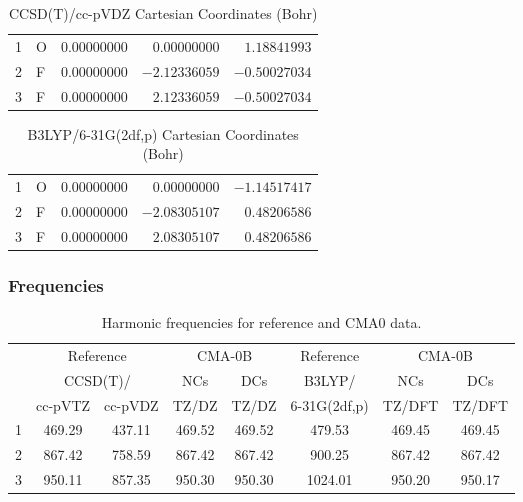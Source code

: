 \documentclass[10pt,oneside]{article}
\begin{document}
\begin{table}[h!]
\centering
\caption{CCSD(T)/cc-pVDZ Cartesian Coordinates (Bohr)}
\begin{tabular}{llrrr}
1  & O  & $ 0.00000000$ & $ 0.00000000$ & $ 1.18841993$ \\
2  & F  & $ 0.00000000$ & $-2.12336059$ & $-0.50027034$ \\
3  & F  & $ 0.00000000$ & $ 2.12336059$ & $-0.50027034$ \\
\end{tabular}
\end{table}

\begin{table}[h!]
\centering
\caption{B3LYP/6-31G(2df,p) Cartesian Coordinates (Bohr)}
\begin{tabular}{llrrr}
1  & O  & $ 0.00000000$ & $ 0.00000000$ & $-1.14517417$ \\
2  & F  & $ 0.00000000$ & $-2.08305107$ & $ 0.48206586$ \\
3  & F  & $ 0.00000000$ & $ 2.08305107$ & $ 0.48206586$ \\
\end{tabular}
\end{table}

\clearpage

\subsubsection*{Frequencies}
\begin{table}[h!]
\centering
\caption{Harmonic frequencies for reference and CMA0 data.}
\begin{tabular}{cccccccc}
\toprule
{} & \multicolumn{2}{c}{Reference} & \multicolumn{2}{c}{CMA-0B} &    Reference & \multicolumn{2}{c}{CMA-0B} \\
{} & \multicolumn{2}{c}{CCSD(T)/} &    NCs &    DCs &       B3LYP/ &    NCs &    DCs \\
{} &   cc-pVTZ & cc-pVDZ &  TZ/DZ &  TZ/DZ & 6-31G(2df,p) & TZ/DFT & TZ/DFT \\
\midrule
1 &    469.29 &  437.11 & 469.52 & 469.52 &       479.53 & 469.45 & 469.45 \\
2 &    867.42 &  758.59 & 867.42 & 867.42 &       900.25 & 867.42 & 867.42 \\
3 &    950.11 &  857.35 & 950.30 & 950.30 &      1024.01 & 950.20 & 950.17 \\
\bottomrule
\end{tabular}
\end{table}
\end{document}
